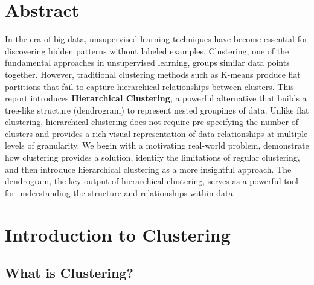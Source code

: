\documentclass{article}
\begin{document}
\tableofcontents
\newpage

\listoffigures
\newpage

\section*{Abstract}

In the era of big data, unsupervised learning techniques have become essential for discovering hidden patterns without labeled examples. Clustering, one of the fundamental approaches in unsupervised learning, groups similar data points together. However, traditional clustering methods such as K-means produce flat partitions that fail to capture hierarchical relationships between clusters. This report introduces \textbf{Hierarchical Clustering}, a powerful alternative that builds a tree-like structure (dendrogram) to represent nested groupings of data. Unlike flat clustering, hierarchical clustering does not require pre-specifying the number of clusters and provides a rich visual representation of data relationships at multiple levels of granularity. We begin with a motivating real-world problem, demonstrate how clustering provides a solution, identify the limitations of regular clustering, and then introduce hierarchical clustering as a more insightful approach. The dendrogram, the key output of hierarchical clustering, serves as a powerful tool for understanding the structure and relationships within data.

\newpage

\section{Introduction to Clustering}

\subsection{What is Clustering?}
\end{document}
